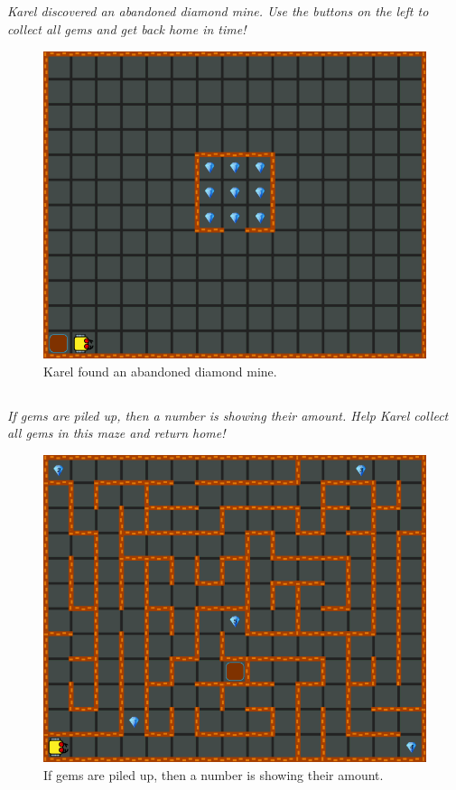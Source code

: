 \documentclass[article,A4,12pt]{llncs}
\begin{document}
\subsection{}

{\em Karel discovered an abandoned diamond mine. Use the buttons
on the left to collect all gems and get back home in time!}

\begin{figure}[!ht]
\begin{center}
\includegraphics[height=0.4\textwidth]{imgk/a11.png}
\end{center}
\vspace{-4mm}
\caption{Karel found an abandoned diamond mine.}
\label{fig:a11}
\vspace{-10mm}
\end{figure}
\newpage
\noindent

\subsection{}

{\em If gems are piled up, then a number is showing their amount. 
Help Karel collect all gems in this maze and return home!}

\begin{figure}[!ht]
\begin{center}
\includegraphics[height=0.4\textwidth]{imgk/a12.png}
\end{center}
\vspace{-4mm}
\caption{If gems are piled up, then a number is showing their amount.}
\label{fig:a12}
\vspace{-10mm}
\end{figure}
\noindent
\end{document}

